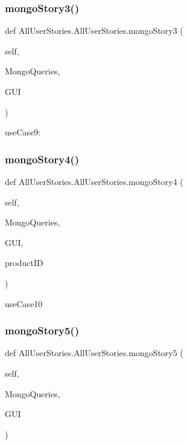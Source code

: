 \subsubsection{\texorpdfstring{mongo\+Story3()}{mongoStory3()}}
{\footnotesize\ttfamily def All\+User\+Stories.\+All\+User\+Stories.\+mongo\+Story3 (\begin{DoxyParamCaption}\item[{}]{self,  }\item[{}]{Mongo\+Queries,  }\item[{}]{G\+UI }\end{DoxyParamCaption})}

\begin{DoxyVerb}useCase9: \end{DoxyVerb}
 \hypertarget{class_all_user_stories_1_1_all_user_stories_a1c32ef2b5c7cdac1fe9e6695b77f798f}{}\label{class_all_user_stories_1_1_all_user_stories_a1c32ef2b5c7cdac1fe9e6695b77f798f} 
\subsubsection{\texorpdfstring{mongo\+Story4()}{mongoStory4()}}
{\footnotesize\ttfamily def All\+User\+Stories.\+All\+User\+Stories.\+mongo\+Story4 (\begin{DoxyParamCaption}\item[{}]{self,  }\item[{}]{Mongo\+Queries,  }\item[{}]{G\+UI,  }\item[{}]{product\+ID }\end{DoxyParamCaption})}

\begin{DoxyVerb}useCase10 \end{DoxyVerb}
 \hypertarget{class_all_user_stories_1_1_all_user_stories_acf328e4938ec594a351ae762464507ad}{}\label{class_all_user_stories_1_1_all_user_stories_acf328e4938ec594a351ae762464507ad} 
\subsubsection{\texorpdfstring{mongo\+Story5()}{mongoStory5()}}
{\footnotesize\ttfamily def All\+User\+Stories.\+All\+User\+Stories.\+mongo\+Story5 (\begin{DoxyParamCaption}\item[{}]{self,  }\item[{}]{Mongo\+Queries,  }\item[{}]{G\+UI }\end{DoxyParamCaption})}


